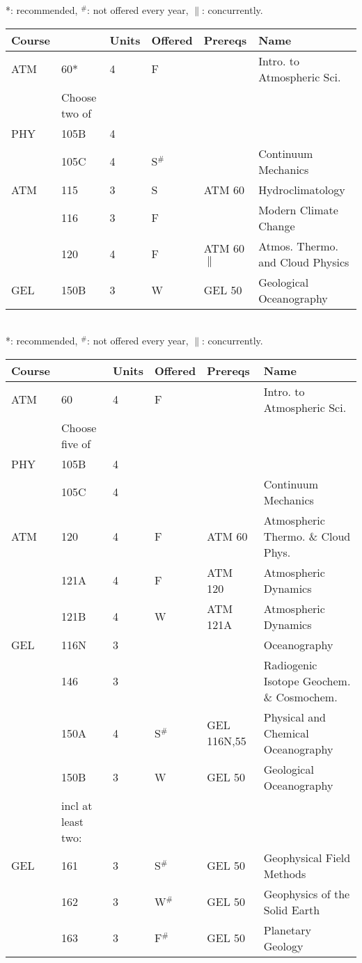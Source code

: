 \documentclass[12pt]{article}
\begin{document}
\vskip 0.25cm
\noindent
*: recommended, $^\#$: not offered every year, $\parallel$: concurrently.\\
\begin{tabular}{|llllll|}
\hline
Course & & Units & Offered & Prereqs & Name \\
\hline
ATM  & 60*    & 4 & F   & & Intro. to Atmospheric Sci. \\
\hline
\hline
    & Choose two of & & & & \\
\hline
PHY  & 105B  & 4 & & & \\
     & 105C  & 4 & S$^\#$ & & Continuum Mechanics \\
ATM  & 115   & 3 & S   & ATM 60 & Hydroclimatology \\
     & 116   & 3 & F   & & Modern Climate Change \\
     & 120   & 4 & F   & ATM 60$\parallel$ & Atmos. Thermo. and Cloud Physics \\
GEL  & 150B  & 3 & W & GEL 50 & Geological Oceanography\\
\hline
\end{tabular}\\

\newpage
{}
\vskip 0.25cm
\noindent
*: recommended, $^\#$: not offered every year, $\parallel$: concurrently.\\
\begin{tabular}{|llllll|}
\hline
Course & & Units & Offered & Prereqs & Name \\
\hline
ATM & 60     & 4 & F   & & Intro. to Atmospheric Sci. \\
\hline
\hline
    & Choose five of & & & & \\
\hline
PHY  & 105B   & 4 & &  & \\
     & 105C   & 4 & &  & Continuum Mechanics\\
ATM  & 120    & 4 & F  & ATM 60    & Atmospheric Thermo. \& Cloud Phys. \\
     & 121A   & 4 & F  & ATM 120   & Atmospheric Dynamics \\
     & 121B   & 4 & W  & ATM 121A  & Atmospheric Dynamics \\
GEL  & 116N   & 3 &    & & Oceanography\\
     & 146    & 3 &    & & Radiogenic Isotope Geochem. \& Cosmochem. \\
     & 150A   & 4 & S$^\#$ & GEL 116N,55 & Physical and Chemical Oceanography\\
     & 150B   & 3 & W  & GEL 50      & Geological Oceanography\\
\hline
     & incl at least two:  & & & & \\
\hline
GEL  & 161    & 3 & S$^\#$ & GEL 50 & Geophysical Field Methods \\
     & 162    & 3 & W$^\#$ & GEL 50 & Geophysics of the Solid Earth \\
     & 163    & 3 & F$^\#$ & GEL 50 & Planetary Geology \\
\hline
\end{tabular}\\
\end{document}
